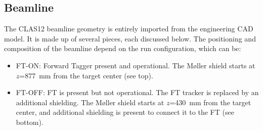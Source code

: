 \subsection{Beamline}
\label{sec:beamline}

The CLAS12 beamline geometry is entirely imported from the engineering CAD model. It is made up of several pieces,
each discussed below. The positioning and composition of the beamline depend on the run configuration, which can be:

\begin{itemize}
\item FT-ON: Forward Tagger present and operational. The M\o ller shield starts at $z$=877~mm from the target
  center (see  top).
  \item FT-OFF: FT is present but not operational. The FT tracker is replaced by an additional shielding.
                 The M\o ller shield starts at $z$=430~mm from the target center, and additional shielding
                 is present to connect it to the FT (see  bottom).
\end{itemize}



